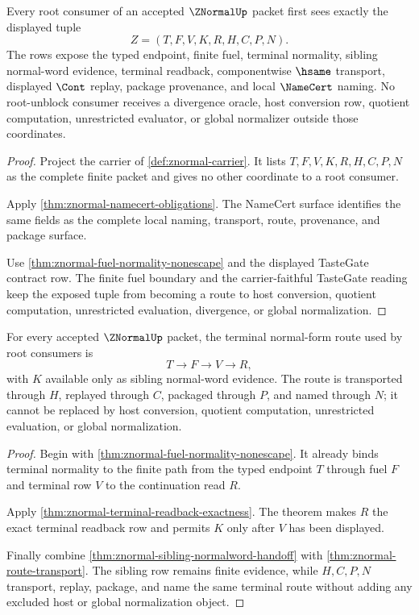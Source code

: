 \begin{theorem}
\label{thm:znormal-root-unblock-carrier-exposure}
Every root consumer of an accepted $\ZNormalUp$ packet first sees exactly the displayed tuple
$$
Z=(T,F,V,K,R,H,C,P,N).
$$
The rows expose the typed endpoint, finite fuel, terminal normality, sibling normal-word evidence, terminal readback, componentwise $\hsame$ transport, displayed $\Cont$ replay, package provenance, and local $\NameCert$ naming. No root-unblock consumer receives a divergence oracle, host conversion row, quotient computation, unrestricted evaluator, or global normalizer outside those coordinates.
\end{theorem}
\begin{proof}
Project the carrier of \autoref{def:znormal-carrier}. It lists $T,F,V,K,R,H,C,P,N$ as the complete finite packet and gives no other coordinate to a root consumer.

Apply \autoref{thm:znormal-namecert-obligations}. The NameCert surface identifies the same fields as the complete local naming, transport, route, provenance, and package surface.

Use \autoref{thm:znormal-fuel-normality-nonescape} and the displayed TasteGate contract row. The finite fuel boundary and the carrier-faithful TasteGate reading keep the exposed tuple from becoming a route to host conversion, quotient computation, unrestricted evaluation, divergence, or global normalization.
\end{proof}

\begin{theorem}
\label{thm:znormal-root-unblock-terminal-route}
For every accepted $\ZNormalUp$ packet, the terminal normal-form route used by root consumers is
$$
T \to F \to V \to R,
$$
with $K$ available only as sibling normal-word evidence. The route is transported through $H$, replayed through $C$, packaged through $P$, and named through $N$; it cannot be replaced by host conversion, quotient computation, unrestricted evaluation, or global normalization.
\end{theorem}
\begin{proof}
Begin with \autoref{thm:znormal-fuel-normality-nonescape}. It already binds terminal normality to the finite path from the typed endpoint $T$ through fuel $F$ and terminal row $V$ to the continuation read $R$.

Apply \autoref{thm:znormal-terminal-readback-exactness}. The theorem makes $R$ the exact terminal readback row and permits $K$ only after $V$ has been displayed.

Finally combine \autoref{thm:znormal-sibling-normalword-handoff} with \autoref{thm:znormal-route-transport}. The sibling row remains finite evidence, while $H,C,P,N$ transport, replay, package, and name the same terminal route without adding any excluded host or global normalization object.
\end{proof}


